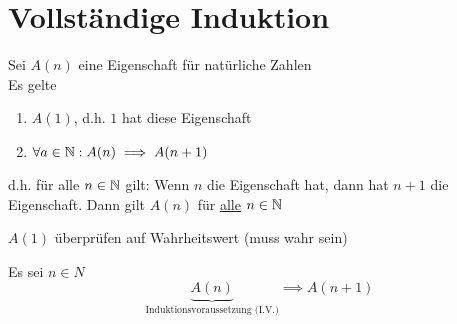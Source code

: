 \documentclass{gadsescript}
\begin{document}
\section{Vollständige Induktion}

\begin{theorem}
	\label{theo:Induktion}
	Sei $ A(n) $ eine Eigenschaft für natürliche Zahlen\\
	Es gelte
	\begin{enumerate}[label=(\roman*)]
		\item $ A(1) $, d.h. $ 1 $ hat diese Eigenschaft
		\item $ \forall a \in \mathbb{N} : A(n) \implies A(n+1) $
	\end{enumerate}
	d.h. für alle $ n \in \mathbb{N} $ gilt: Wenn $ n $ die Eigenschaft hat, dann hat $ n + 1 $ die Eigenschaft.
	Dann gilt $ A(n) $ für \underline{alle} $ n \in \mathbb{N} $
	\begin{blackbox}[Induktionsanfang (I.A.)]
		$ A(1) $ überprüfen auf Wahrheitswert (muss wahr sein)
	\end{blackbox}
	\begin{blackbox}[Induktionsschritt (I.S.)]
		Es sei $ n \in N $
		\[ \underbrace{A(n)}_{\text{Induktionsvoraussetzung (I.V.)}} \implies A(n+1) \]
	\end{blackbox}
\end{theorem}
\end{document}
